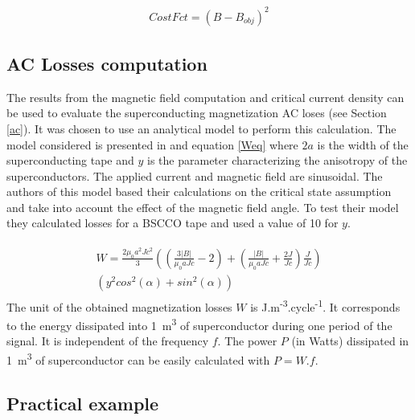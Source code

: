 \documentclass{ws-jmrr}
\begin{document}
\begin{multicols}{2}
\begin{align}
CostFct=\left ( B-B_{obj} \right )^{2}
\label{CostFct}
\end{align}

\subsection{AC Losses computation}
\label{aclosses}
The results from the magnetic field computation and critical current density can be used to evaluate the superconducting magnetization AC loses (see Section \ref{ac}). It was chosen to use an analytical model to perform this calculation. The model considered is presented in \cite{zhang2003angular} and equation \ref{Weq} where $2a$ is the width of the superconducting tape and $y$ is the parameter characterizing the anisotropy of the superconductors. The applied current and magnetic field are sinusoidal. The authors of this model based their calculations on the critical state assumption \cite{bean1962magnetization} and take into account the effect of the magnetic field angle. To test their model they calculated losses for a BSCCO tape and used a value of 10 for $y$. \par

\begin{align}
\begin{split}
W=\frac{2\mu_0a^2Jc^2}{3}\left ( \left (\frac{3\left |B  \right |}{\mu_0aJc}-2  \right  )+\left (\frac{\left |B  \right |}{\mu_0aJc}+\frac{2J}{Jc}  \right )\frac{J}{Jc}\right ) \\ \left ( y^2cos^2(\alpha )+sin^2(\alpha ) \right )
\label{Weq}
\end{split}
\end{align}
The unit of the obtained magnetization losses $W$ is J.m\textsuperscript{-3}.cycle\textsuperscript{-1}. It corresponds to the energy dissipated into 1~m\textsuperscript{3} of superconductor during one period of the signal. It is independent of the frequency $f$. The power $P$ (in Watts) dissipated in 1~m\textsuperscript{3} of superconductor can be easily calculated with $P=W.f$.    

\subsection{Practical example}


\end{multicols}
\end{document}
